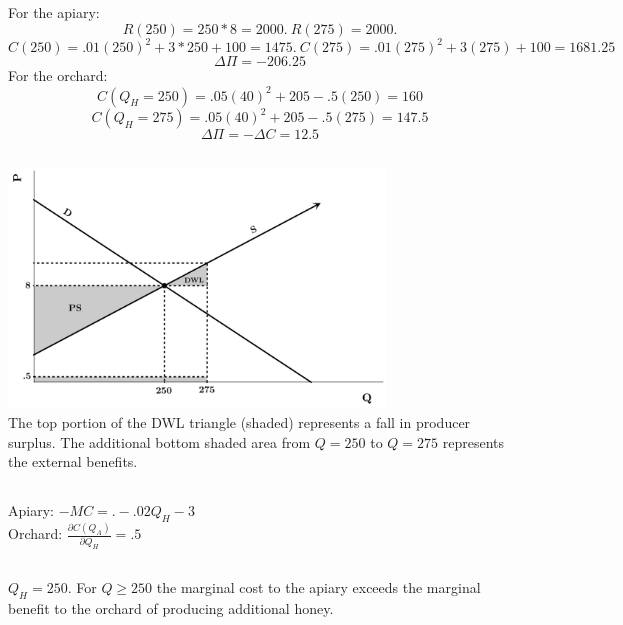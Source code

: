 \documentclass{article}
\begin{document}
	\subsection[g]{}
	For the apiary: 
		$$R(250)=250*8=2000.~R(275)=2000. $$
		$$ C(250) = .01(250)^2+3*250+100 = 1475.~ C(275) = .01(275)^2+3(275)+100=1681.25$$
		$$\Delta \Pi = -206.25$$
	For the orchard: 
		$$C(Q_H=250) = .05(40)^2 + 205 -.5(250) = 160$$
		$$C(Q_H=275) = .05(40)^2 + 205-.5(275) = 147.5$$
		$$\Delta \Pi = - \Delta C = 12.5	$$
	\subsection[h]{}
		\includegraphics[height=2.5in]{Charts/4h} \\
		The top portion of the DWL triangle (shaded) represents a fall in producer surplus. The additional bottom shaded area from $Q=250$ to $Q=275$ represents the external benefits. 
	\subsection[i]{}
		Apiary: $-MC=.-.02Q_H-3$\\
		Orchard: $\frac{\partial C(Q_A)}{\partial Q_H} = .5$
	\subsection[j]{}
		$Q_H=250.$ For $Q \geq 250$ the marginal cost to the apiary exceeds the marginal benefit to the orchard of producing additional honey.
\section[5]{}
\end{document}

